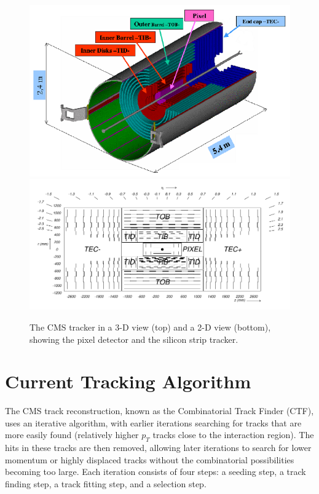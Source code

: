 \documentclass{JINST}
\begin{document}
\begin{figure}[!Hhtb]
\begin{center}
	\includegraphics[width=1.0\textwidth]{figs/CMSTrackerLayout.pdf}
	\includegraphics[width=1.0\textwidth]{figs/CMS2DLayout.pdf}
	\caption{The CMS tracker in a 3-D view (top) and a 2-D view (bottom), showing the pixel detector and the silicon
	strip tracker. \label{fig:tracker}}
	\end{center}
\end{figure}


\section{Current Tracking Algorithm}

The CMS track reconstruction, known as the Combinatorial Track Finder (CTF), uses an iterative algorithm,
with earlier iterations searching for tracks that are more easily found (relatively higher $p_T$ tracks
close to the interaction region). The hits in these tracks are then removed, allowing later iterations to
search for lower momentum or highly displaced tracks without the combinatorial possibilities becoming too
large. Each iteration consists of four steps: a seeding step, a track finding step, a track fitting step,
and a selection step.
\end{document}
